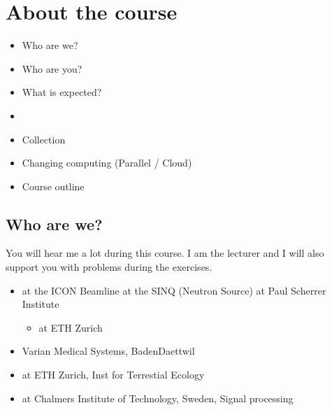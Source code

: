 \documentclass[letterpaper,10pt,english]{sphinxmanual}
\begin{document}
\chapter{About the course}
\label{\detokenize{01-Introduction:about-the-course}}\begin{itemize}
\item {} 
\sphinxAtStartPar
Who are we?

\item {} 
\sphinxAtStartPar
Who are you?

\item {} 
\sphinxAtStartPar
What is expected?

\item {} 
\sphinxAtStartPar
{}

\item {} 
\sphinxAtStartPar
Collection

\item {} 
\sphinxAtStartPar
Changing computing (Parallel / Cloud)

\item {} 
\sphinxAtStartPar
Course outline

\end{itemize}


\section{Who are we?}
\label{\detokenize{01-Introduction:who-are-we}}


\sphinxAtStartPar
{}

\sphinxAtStartPar
You will hear me a lot during this course. I am the lecturer and I will also support you with problems during the exercises.


\begin{itemize}
\item {} 
\sphinxAtStartPar
{} at the ICON Beamline at the SINQ (Neutron Source) at Paul Scherrer Institute
\begin{itemize}
\item {} 
\sphinxAtStartPar
{} at ETH Zurich

\end{itemize}

\item {} 
\sphinxAtStartPar
{} Varian Medical Systems, Baden\sphinxhyphen{}Daettwil

\item {} 
\sphinxAtStartPar
{} at ETH Zurich, Inst for Terrestial Ecology

\item {} 
\sphinxAtStartPar
{} at Chalmers Institute of Technology, Sweden, Signal processing

\end{itemize}
\end{document}
